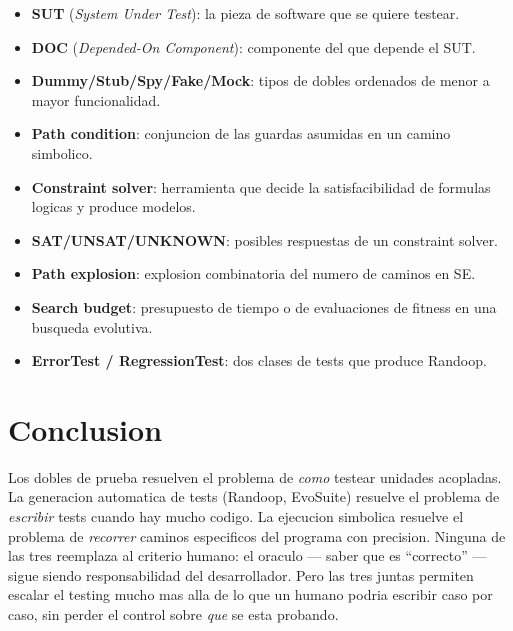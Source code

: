 \documentclass[12pt,a4paper]{article}
\begin{document}
\begin{itemize}
  \item \textbf{SUT} (\emph{System Under Test}): la pieza de software que se quiere
  testear.
  \item \textbf{DOC} (\emph{Depended-On Component}): componente del que depende el SUT.
  \item \textbf{Dummy/Stub/Spy/Fake/Mock}: tipos de dobles ordenados de menor a mayor
  funcionalidad.
  \item \textbf{Path condition}: conjuncion de las guardas asumidas en un camino simbolico.
  \item \textbf{Constraint solver}: herramienta que decide la satisfacibilidad de formulas
  logicas y produce modelos.
  \item \textbf{SAT/UNSAT/UNKNOWN}: posibles respuestas de un constraint solver.
  \item \textbf{Path explosion}: explosion combinatoria del numero de caminos en SE.
  \item \textbf{Search budget}: presupuesto de tiempo o de evaluaciones de fitness en una
  busqueda evolutiva.
  \item \textbf{ErrorTest / RegressionTest}: dos clases de tests que produce Randoop.
\end{itemize}

\section*{Conclusion}

Los dobles de prueba resuelven el problema de \emph{como} testear unidades acopladas. La
generacion automatica de tests (Randoop, EvoSuite) resuelve el problema de \emph{escribir}
tests cuando hay mucho codigo. La ejecucion simbolica resuelve el problema de
\emph{recorrer} caminos especificos del programa con precision. Ninguna de las tres
reemplaza al criterio humano: el oraculo --- saber que es ``correcto'' --- sigue siendo
responsabilidad del desarrollador. Pero las tres juntas permiten escalar el testing mucho
mas alla de lo que un humano podria escribir caso por caso, sin perder el control sobre
\emph{que} se esta probando.
\end{document}
